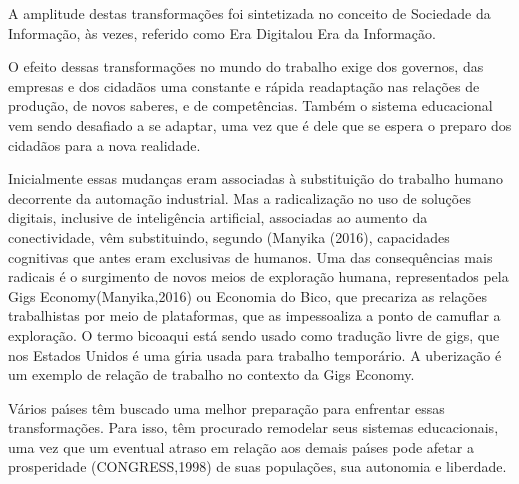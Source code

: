 \documentclass[
12pt,		%
openright,	%
twoside,  %
a4paper,			%
chapter=TITLE,		%
english,			%
french,				%
spanish,			%
brazil				%
]{USPSC-classe/USPSC}
\begin{document}
A amplitude destas transforma\c{c}\~oes foi sintetizada no conceito de \textquotedbl Sociedade da Informa\c{c}\~ao\textquotedbl , \`as vezes, referido como \textquotedbl Era Digital\textquotedbl  ou \textquotedbl Era da Informa\c{c}\~ao\textquotedbl .









O efeito dessas transforma\c{c}\~oes no mundo do trabalho exige dos governos, das empresas e dos cidad\~aos uma constante e r\'apida readapta\c{c}\~ao  nas rela\c{c}\~oes de produ\c{c}\~ao, de novos saberes, e de  compet\^encias. Tamb\'em o sistema educacional vem sendo desafiado a se adaptar, uma vez que \'e dele que se espera o preparo dos cidad\~aos para a nova realidade.









Inicialmente essas mudan\c{c}as eram associadas \`a substitui\c{c}\~ao do trabalho humano decorrente da automa\c{c}\~ao industrial. Mas a radicaliza\c{c}\~ao no uso de solu\c{c}\~oes digitais, inclusive de intelig\^encia artificial, associadas ao aumento da conectividade, v\^em substituindo, segundo (Manyika (2016), \textquotedbl capacidades cognitivas que antes eram exclusivas de humanos\textquotedbl . Uma das consequ\^encias mais radicais \'e o surgimento de novos meios de explora\c{c}\~ao humana, representados pela \textquotedbl Gigs Economy\textquotedbl  (Manyika,2016) ou \textquotedbl Economia do Bico\textquotedbl , que precariza as rela\c{c}\~oes trabalhistas por meio de plataformas, que as impessoaliza a ponto de camuflar a explora\c{c}\~ao. O termo \textquotedbl bico\textquotedbl  aqui est\'a sendo usado como tradu\c{c}\~ao livre de \textquotedbl gigs\textquotedbl , que nos Estados Unidos \'e uma g\'{\i}ria usada para trabalho tempor\'ario. A uberiza\c{c}\~ao \'e um exemplo de rela\c{c}\~ao de trabalho no contexto da Gigs Economy.









V\'arios pa\'{\i}ses t\^em buscado uma melhor prepara\c{c}\~ao para enfrentar essas transforma\c{c}\~oes. Para isso, t\^em procurado remodelar seus sistemas educacionais, uma vez que um eventual atraso em rela\c{c}\~ao aos demais pa\'{\i}ses pode afetar a prosperidade (CONGRESS,1998) de suas popula\c{c}\~oes, sua autonomia e liberdade.
\end{document}
